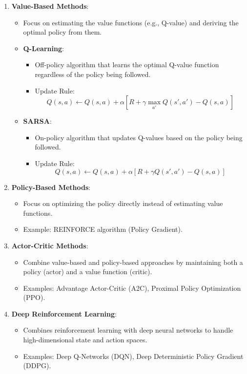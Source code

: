 \begin{enumerate}
    \item \textbf{Value-Based Methods}:
    \begin{itemize}
        \item Focus on estimating the value functions (e.g., Q-value) and deriving the optimal policy from them.
        \item \textbf{Q-Learning}:
        \begin{itemize}
            \item Off-policy algorithm that learns the optimal Q-value function regardless of the policy being followed.
            \item Update Rule:
            \[
            Q(s, a) \leftarrow Q(s, a) + \alpha [R + \gamma \max_{a'} Q(s', a') - Q(s, a)]
            \]
        \end{itemize}
        \item \textbf{SARSA}:
        \begin{itemize}
            \item On-policy algorithm that updates Q-values based on the policy being followed.
            \item Update Rule:
            \[
            Q(s, a) \leftarrow Q(s, a) + \alpha [R + \gamma Q(s', a') - Q(s, a)]
            \]
        \end{itemize}
    \end{itemize}

    \item \textbf{Policy-Based Methods}:
    \begin{itemize}
        \item Focus on optimizing the policy directly instead of estimating value functions.
        \item Example: REINFORCE algorithm (Policy Gradient).
    \end{itemize}

    \item \textbf{Actor-Critic Methods}:
    \begin{itemize}
        \item Combine value-based and policy-based approaches by maintaining both a policy (actor) and a value function (critic).
        \item Examples: Advantage Actor-Critic (A2C), Proximal Policy Optimization (PPO).
    \end{itemize}

    \item \textbf{Deep Reinforcement Learning}:
    \begin{itemize}
        \item Combines reinforcement learning with deep neural networks to handle high-dimensional state and action spaces.
        \item Examples: Deep Q-Networks (DQN), Deep Deterministic Policy Gradient (DDPG).
    \end{itemize}
\end{enumerate}


